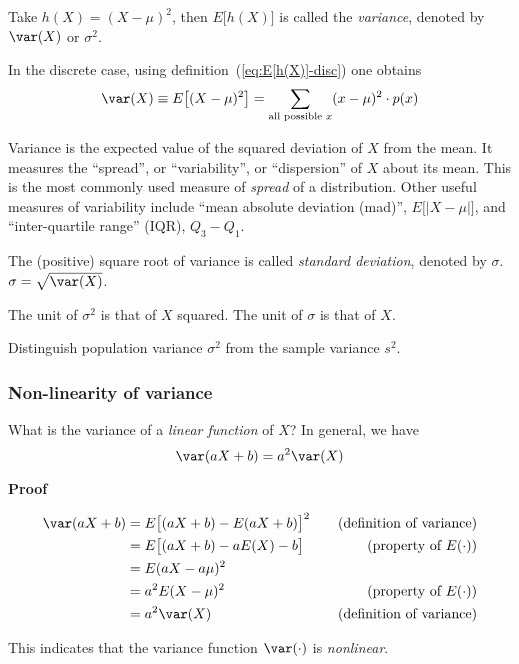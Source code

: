 \documentclass[12pt]{article}
\begin{document}
Take $h(X) = (X - \mu)^2$, then $E\bigl[h(X)\bigr]$ is called
the \emph{variance}, denoted by $\var(X)$ or $\sigma^2$.

In the discrete case, using definition~(\ref{eq:E[h(X)]-disc})
one obtains
\begin{equation}\label{eq:var-def-disc}
\var(X)
\equiv E\bigl[(X - \mu)^2\bigr]
= \sum_{\text{all possible $x$}} (x - \mu)^2 \cdot p(x)
\end{equation}

Variance is the expected value of the squared deviation of $X$ from the
mean.
It measures the ``spread'', or ``variability'', or ``dispersion''
of $X$ about its mean.
This is the most commonly used measure of \emph{spread}
of a distribution.
Other useful measures of variability include
``mean absolute deviation (mad)'',
$E\bigl[|X - \mu|\bigr]$,
and ``inter-quartile range'' (IQR),
$Q_3 - Q_1$.

The (positive) square root of variance is called
\emph{standard deviation}, denoted by $\sigma$.
$\sigma = \sqrt{\var(X)}$.

The unit of $\sigma^2$ is that of $X$ squared.
The unit of $\sigma$ is that of $X$.

\note
Distinguish population variance $\sigma^2$ from the sample variance
$s^2$.


\subsubsection{Non-linearity of variance}

What is the variance of a \emph{linear function} of $X$?
In general, we have
\[
\var(aX + b) = a^2\var(X)
\]

\textbf{Proof}

\begin{align*}
\var(aX + b)
&= E\bigl[(aX + b) - E(aX + b)\bigr]^2 \quad
    &\text{(definition of variance)}
\\
&= E\bigl[(aX + b) - aE(X) - b\bigr]
    &\text{(property of $E(\cdot)$)}
\\
&= E(aX - a\mu)^2
\\
&= a^2 E(X - \mu)^2
    &\text{(property of $E(\cdot)$)}
\\
&= a^2 \var(X)
    &\text{(definition of variance)}
\end{align*}

This indicates that the variance function $\var(\cdot)$
is \emph{nonlinear}.

\end{document}
